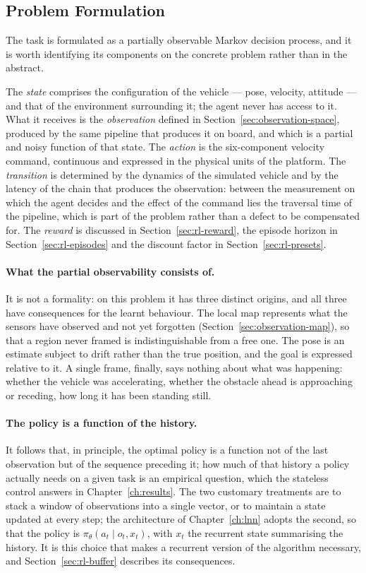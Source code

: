 \subsection{Problem Formulation}
\label{sec:rl-pomdp}

The task is formulated as a partially observable Markov decision process, and it
is worth identifying its components on the concrete problem rather than in the
abstract.

The \emph{state} comprises the configuration of the vehicle --- pose, velocity,
attitude --- and that of the environment surrounding it; the agent never has
access to it. What it receives is the \emph{observation} defined in
Section~\ref{sec:observation-space}, produced by the same pipeline that produces
it on board, and which is a partial and noisy function of that state. The
\emph{action} is the six-component velocity command, continuous and expressed in
the physical units of the platform. The \emph{transition} is determined by the
dynamics of the simulated vehicle and by the latency of the chain that produces
the observation: between the measurement on which the agent decides and the
effect of the command lies the traversal time of the pipeline, which is part of
the problem rather than a defect to be compensated for. The \emph{reward} is
discussed in Section~\ref{sec:rl-reward}, the episode horizon in
Section~\ref{sec:rl-episodes} and the discount factor in
Section~\ref{sec:rl-presets}.

\paragraph{What the partial observability consists of.}
It is not a formality: on this problem it has three distinct origins, and all
three have consequences for the learnt behaviour. The local map represents what
the sensors have observed and not yet forgotten
(Section~\ref{sec:observation-map}), so that a region never framed is
indistinguishable from a free one. The pose is an estimate subject to drift
rather than the true position, and the goal is expressed relative to it. A single
frame, finally, says nothing about what was happening: whether the vehicle was
accelerating, whether the obstacle ahead is approaching or receding, how long it
has been standing still.

\paragraph{The policy is a function of the history.}
It follows that, in principle, the optimal policy is a function not of the last
observation but of the sequence preceding it; how much of that history a policy
actually needs on a given task is an empirical question, which the stateless
control answers in Chapter~\ref{ch:results}. The two customary treatments are to stack a window
of observations into a single vector, or to maintain a state updated at every
step; the architecture of Chapter~\ref{ch:lnn} adopts the second, so that the
policy is $\pi_\theta(a_t \mid o_t, x_t)$, with $x_t$ the recurrent state
summarising the history. It is this choice that makes a recurrent version of the
algorithm necessary, and Section~\ref{sec:rl-buffer} describes its consequences.

